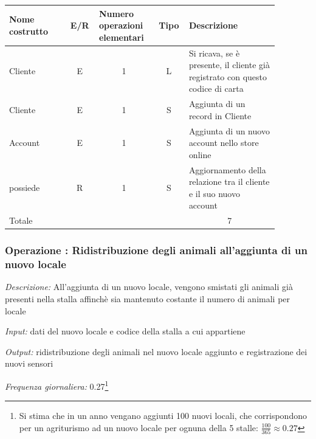 \documentclass[12pt,a4paper]{article}
\begin{document}
\begin{center}\setlength{\extrarowheight}{1.5pt}\begin{longtable}{|p{0.2\linewidth}|p{0.1\linewidth}|p{0.175\linewidth}|p{0.1\linewidth}|p{0.3\linewidth}|}\hline \textbf{Nome costrutto}   & \multicolumn{1}{|c|}{\textbf{E/R}} & \textbf{Numero operazioni elementari} & \multicolumn{1}{|c|}{\textbf{Tipo}} & \textbf{Descrizione}\\ 
\hline
Cliente
 & 
\multicolumn{1}{|c|}{E}
 & 
\multicolumn{1}{|c|}{1}
 & 
\multicolumn{1}{|c|}{L}
 & 
Si ricava, se è presente, il cliente già registrato con questo codice di carta
\\
\hline
Cliente
 & 
\multicolumn{1}{|c|}{E}
 & 
\multicolumn{1}{|c|}{1}
 & 
\multicolumn{1}{|c|}{S}
 & 
Aggiunta di un record in Cliente
\\
\hline
Account
 & 
\multicolumn{1}{|c|}{E}
 & 
\multicolumn{1}{|c|}{1}
 & 
\multicolumn{1}{|c|}{S}
 & 
Aggiunta di un nuovo account nello store online
\\
\hline
possiede
 & 
\multicolumn{1}{|c|}{R}
 & 
\multicolumn{1}{|c|}{1}
 & 
\multicolumn{1}{|c|}{S}
 & 
Aggiornamento della relazione tra il cliente e il suo nuovo account
\\
\hline
\multicolumn{4}{|l|}{Totale}
 & 
\multicolumn{1}{|c|}{7}
\\
\hline
\end{longtable}\end{center}

\subsubsection*{Operazione \thecounterAccessi{}: Ridistribuzione degli animali all'aggiunta di un nuovo locale}
\noindent\textit{Descrizione:} All'aggiunta di un nuovo locale, vengono smistati gli animali già presenti nella stalla affinchè sia mantenuto costante il numero di animali per locale

\noindent\textit{Input:} dati del nuovo locale e codice della stalla a cui appartiene

\noindent\textit{Output:} ridistribuzione degli animali nel nuovo locale aggiunto e registrazione dei nuovi sensori

\noindent\textit{Frequenza giornaliera:} 0.27\footnote{Si stima che in un anno vengano aggiunti 100 nuovi locali, che corrispondono per un agriturismo ad un nuovo locale per ognuna della 5 stalle: $\frac{100}{365}\approx 0.27$}
\end{document}
